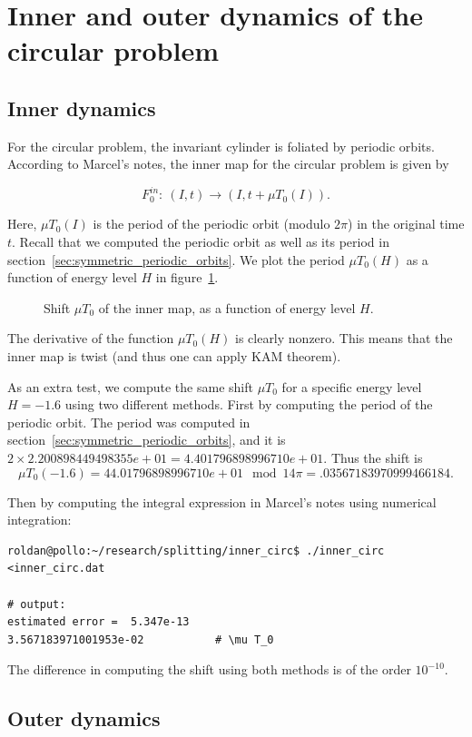 \documentclass[a4paper]{amsart}
\theoremstyle{remark}
\begin{document}
\section{Inner and outer dynamics of the circular problem}

\subsection{Inner dynamics}

For the circular problem, the invariant cylinder is foliated by
periodic orbits.
According to Marcel's notes, the inner map for the circular problem is
given by

\[ F_0^{in}\colon\ (I,t)\to (I, t+\mu T_0(I)). \]

Here, $\mu T_0(I)$ is the period of the periodic orbit (modulo $2\pi$) in
the original time $t$.
Recall that we computed the periodic orbit as well as its period in
section~\ref{sec:symmetric_periodic_orbits}.
We plot the period $\mu T_0(H)$ as a function of energy level $H$ in
figure~\ref{fig:inner_circ}.

\begin{figure}
\caption{Shift $\mu T_0$ of the inner map, as a function of energy level $H$.}
\label{fig:inner_circ}
\end{figure}

The derivative of the function $\mu T_0(H)$ is clearly nonzero.
This means that the inner map is twist (and thus one can apply KAM
theorem).

As an extra test, we compute the same shift $\mu T_0$ for a specific
energy level $H=-1.6$ using two different methods. First by computing
the period of the periodic orbit. The period was computed in
section~\ref{sec:symmetric_periodic_orbits}, and it is $2\times
2.200898449498355e+01 = 4.401796898996710e+01$. Thus the shift is
\[ \mu T_0(-1.6) = 44.01796898996710e+01 \mod 14\pi =
.03567183970999466184. \]

Then by computing the integral expression in Marcel's notes using
numerical integration:
\begin{verbatim}
roldan@pollo:~/research/splitting/inner_circ$ ./inner_circ <inner_circ.dat 

# output: 
estimated error =  5.347e-13
3.567183971001953e-02           # \mu T_0
\end{verbatim}
The difference in computing the shift using both methods is of the order
$10^{-10}$.

\subsection{Outer dynamics}
\end{document}
